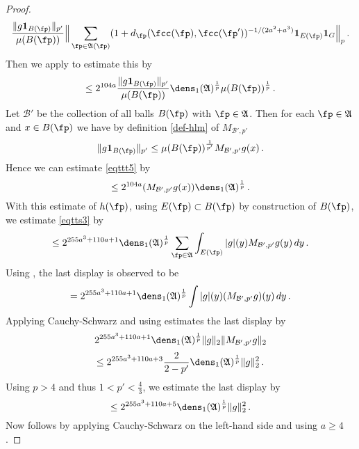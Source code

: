 \begin{proof}
\begin{equation}
    \frac{\|g\mathbf{1}_{B(\fp)}\|_{p'}}{\mu(B(\fp))}
    \Big\|\sum_{\fp\in\mathfrak{A}(\fp)}(1+d_{\fp}(\fcc(\fp), \fcc(\fp'))^{-1/(2a^2+a^3)}\mathbf{1}_{E(\fp)}\mathbf{1}_G\Big\|_{p}\, .
\end{equation}
Then we apply  to estimate this by
\begin{equation}\label{eqttt5}
    \le 2^{104a}
    \frac{\|g\mathbf{1}_{B(\fp)}\|_{p'}}{\mu(B(\fp))}
    \dens_1(\mathfrak{A})^{\frac 1p}\mu(B(\fp))^{\frac 1p}\,.
\end{equation}
Let $\mathcal{B}'$ be the collection of all balls
$B(\fp)$ with $\fp\in \mathfrak{A}$. Then
for each $\fp\in \mathfrak{A}$ and $x\in B(\fp)$ we have by
definition \eqref{def-hlm} of $M_{\mathcal{B}',p'}$
\begin{equation}
    \|g\mathbf{1}_{B(\fp)}\|_{p'}\le
    \mu(B(\fp))^{\frac 1{p'}} M_{\mathcal{B}',p'}g(x) \, .
\end{equation}
Hence we can estimate \eqref{eqttt5} by
\begin{equation}
\label{eqttt5b}
    \le
    2^{104a}
    (M_{\mathcal{B}', p'}g(x))
   \dens_1(\mathfrak{A})^{\frac 1p}\, .
\end{equation}
With this estimate of $h(\fp)$,
using $E(\fp)\subset B(\fp)$ by construction of $B(\fp)$, we estimate
\eqref{eqtts3} by
 \begin{equation}\label{eqtts4}
 \le 2^{255a^3+110a + 1} { \dens_1(\mathfrak{A})^{\frac 1p}}\sum_{\fp\in \mathfrak{A}}
 \int_{E(\fp)}|g|(y)M_{\mathcal{B}', p'}g(y) \, dy\,.
         \end{equation}
Using ,
the last display is observed to be
\begin{equation}\label{eqtts4a}
= 2^{255a^3+110a + 1}
 {\dens_1(\mathfrak{A})^{\frac 1p}} \int |g|(y)(M_{\mathcal{B}', p'}g)(y) \, dy\,.
         \end{equation}
Applying Cauchy-Schwarz and using estimates the last display by
\begin{equation}
    2^{255a^3+110a + 1} \dens_1(\mathfrak{A})^{\frac 1p}
    \|g\|_2 \|M_{\mathcal{B}', p'} g\|_2
\end{equation}
\begin{equation}
    \le 2^{255a^3+110a + 3}\frac{2}{2-p'}
    \dens_1(\mathfrak{A})^{\frac 1p}\|g\|_2 ^2\,.
\end{equation}
Using $p>4$ and thus $1<p'<\frac 43$, we estimate the last display by
\begin{equation}
    \le 2^{255a^3+110a + 5} \dens_1(\mathfrak{A})^{\frac 1p}
    \|g\|_2^2\,.
\end{equation}
Now  follows by applying Cauchy-Schwarz on the left-hand side and using
$a\ge 4$.
\end{proof}
